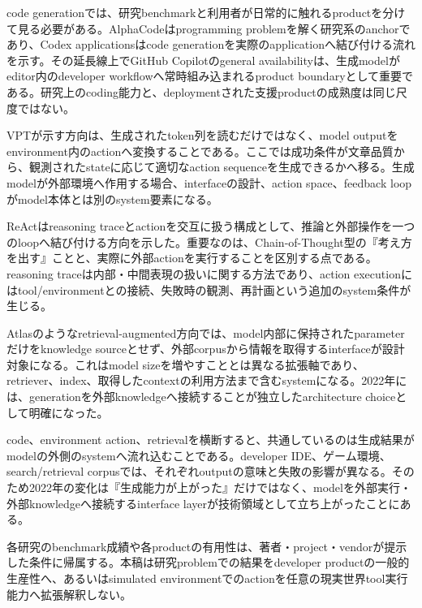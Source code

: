 
code generationでは、研究benchmarkと利用者が日常的に触れるproductを分けて見る必要がある。AlphaCodeはprogramming problemを解く研究系のanchorであり、Codex applicationsはcode generationを実際のapplicationへ結び付ける流れを示す。その延長線上でGitHub Copilotのgeneral availabilityは、生成modelがeditor内のdeveloper workflowへ常時組み込まれるproduct boundaryとして重要である。研究上のcoding能力と、deploymentされた支援productの成熟度は同じ尺度ではない。\autocite{src-21b0842f98ec,src-8170b5e4c279,src-b1418e7ae779,src-dc0d76e03fc6}


VPTが示す方向は、生成されたtoken列を読むだけではなく、model outputをenvironment内のactionへ変換することである。ここでは成功条件が文章品質から、観測されたstateに応じて適切なaction sequenceを生成できるかへ移る。生成modelが外部環境へ作用する場合、interfaceの設計、action space、feedback loopがmodel本体とは別のsystem要素になる。\autocite{src-4e33c3e8216e,src-d117f3860a91}


ReActはreasoning traceとactionを交互に扱う構成として、推論と外部操作を一つのloopへ結び付ける方向を示した。重要なのは、Chain-of-Thought型の『考え方を出す』ことと、実際に外部actionを実行することを区別する点である。reasoning traceは内部・中間表現の扱いに関する方法であり、action executionにはtool/environmentとの接続、失敗時の観測、再計画という追加のsystem条件が生じる。\autocite{src-811e1008822e}


Atlasのようなretrieval-augmented方向では、model内部に保持されたparameterだけをknowledge sourceとせず、外部corpusから情報を取得するinterfaceが設計対象になる。これはmodel sizeを増やすこととは異なる拡張軸であり、retriever、index、取得したcontextの利用方法まで含むsystemになる。2022年には、generationを外部knowledgeへ接続することが独立したarchitecture choiceとして明確になった。\autocite{src-039e57a4916e}


code、environment action、retrievalを横断すると、共通しているのは生成結果がmodelの外側のsystemへ流れ込むことである。developer IDE、ゲーム環境、search/retrieval corpusでは、それぞれoutputの意味と失敗の影響が異なる。そのため2022年の変化は『生成能力が上がった』だけではなく、modelを外部実行・外部knowledgeへ接続するinterface layerが技術領域として立ち上がったことにある。\autocite{src-039e57a4916e,src-21b0842f98ec,src-4e33c3e8216e,src-811e1008822e,src-8170b5e4c279,src-b1418e7ae779,src-d117f3860a91,src-dc0d76e03fc6}


\begin{claimboundary}
各研究のbenchmark成績や各productの有用性は、著者・project・vendorが提示した条件に帰属する。本稿は研究problemでの結果をdeveloper productの一般的生産性へ、あるいはsimulated environmentでのactionを任意の現実世界tool実行能力へ拡張解釈しない。\autocite{src-811e1008822e,src-b1418e7ae779}
\end{claimboundary}
